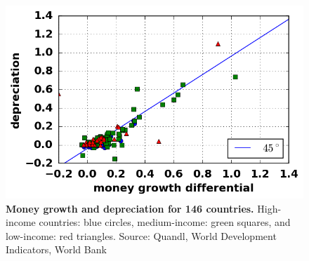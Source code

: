 \begin{figure}[h]
\caption{\label{fig:money_differential_depreciation_open} \textbf{Money growth and depreciation for 146 countries.} High-income countries: blue circles, medium-income: green squares, and low-income: red triangles. {\tiny Source: Quandl, World Development Indicators, World Bank}}
\hspace*{-.5cm}\includegraphics[height = 7.cm]{./png/fig_money_differential_depreciation_open.png}
\end{figure}